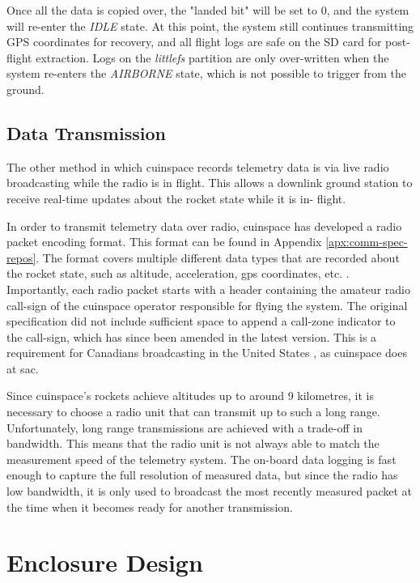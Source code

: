 Once all the data is copied over, the "landed bit" will be set to 0, and the system will re-enter the \textit{IDLE}
state. At this point, the system still continues transmitting GPS coordinates for recovery, and all flight logs are
safe on the SD card for post-flight extraction. Logs on the \textit{littlefs} partition are only over-written when the
system re-enters the \textit{AIRBORNE} state, which is not possible to trigger from the ground.

\subsection{Data Transmission}

The other method in which \gls{cuinspace} records telemetry data is via live radio broadcasting while the radio is in
flight. This allows a downlink ground station to receive real-time updates about the rocket state while it is in-
flight.

In order to transmit telemetry data over radio, \gls{cuinspace} has developed a radio packet encoding format. This
format can be found in Appendix \ref{apx:comm-spec-repos}. The format covers multiple different data types that are
recorded about the rocket state, such as altitude, acceleration, \gls{gps} coordinates, etc. \cite{radio-comms}.
Importantly, each radio packet starts with a header containing the amateur radio call-sign of the \gls{cuinspace}
operator responsible for flying the system. \cite{radio-comms} The original specification did not include sufficient
space to append a call-zone indicator to the call-sign, which has since been amended in the latest version. This is a
requirement for Canadians broadcasting in the United States \cite{foreign-broadcast}, as \gls{cuinspace} does at
\gls{sac}.

Since \gls{cuinspace}'s rockets achieve altitudes up to around 9 kilometres, it is necessary to choose a radio unit
that can transmit up to such a long range. Unfortunately, long range transmissions are achieved with a trade-off in
bandwidth. This means that the radio unit is not always able to match the measurement speed of the telemetry system.
The on-board data logging is fast enough to capture the full resolution of measured data, but since the radio has low
bandwidth, it is only used to broadcast the most recently measured packet at the time when it becomes ready for another
transmission.

\section{Enclosure Design}

